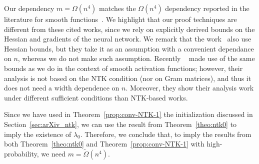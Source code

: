 
\begin{remark} 
Our dependency $m=\Omega(n^4)$ matches the $\Omega(n^4)$ dependency reported in the literature for smooth functions~\citep{ng2020hermite1,SD-JL-HL-LW-XZ:19}. We highlight that our proof techniques are different from these cited works, since we rely on explicitly derived bounds on the Hessian and gradients of the neural network. We remark that the work~\citep{CL-LZ-MB:21} also use Hessian bounds, but they take it as an assumption with a convenient dependance on $n$, whereas we do not make such assumption. Recently ~\citet{AB-PCV-LZ-MB:22} made use of the same bounds as we do in the context of smooth activation functions; however, their analysis is not based on the NTK condition (nor on Gram matrices), and thus it does not need a width dependence on $n$. Moreover, they show their analysis work under different sufficient conditions than NTK-based works.  
\end{remark}

\begin{remark}
Since we have used in Theorem~\ref{prop:conv-NTK-1} the initialization discussed in Section~\ref{sec:arXiv_ntk}, we can use the result from Theorem~\ref{theo:ntk0} to imply the existence of $\lambda_0$. 
Therefore, we conclude that, to imply the results from both Theorem~\ref{theo:ntk0} and Theorem~\ref{prop:conv-NTK-1} with high-probability, we need $m=\tilde{\Omega}(n^4)$.
\end{remark}



